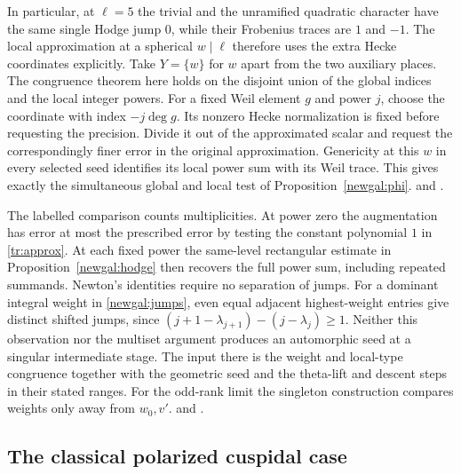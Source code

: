 In particular, at \(\ell=5\) the trivial and the unramified quadratic
character have the same single Hodge jump \(0\), while their Frobenius
traces are \(1\) and \(-1\). The local approximation at a spherical
\(w\mid\ell\) therefore uses the extra Hecke coordinates explicitly.
Take \(Y=\{w\}\) for \(w\) apart from the two auxiliary places. The
congruence theorem here holds on the disjoint union of the global
indices and the local integer powers. For a fixed Weil element \(g\)
and power \(j\), choose the coordinate with index \(-j\deg g\).
Its nonzero Hecke normalization is fixed before requesting the
precision. Divide it out of the approximated scalar and request the
correspondingly finer error in the original approximation. Genericity
at this \(w\) in every selected seed identifies its local power sum
with its Weil trace. This gives exactly the simultaneous global and local
test of Proposition~\ref{newgal:phi}.
and .

The labelled comparison counts multiplicities. At power zero the
augmentation has error at most the prescribed error by testing the
constant polynomial \(1\) in \eqref{tr:approx}. At each fixed power
the same-level rectangular estimate in Proposition~\ref{newgal:hodge}
then recovers the full power sum, including repeated summands. Newton's
identities require no separation of jumps. For a dominant integral
weight in \eqref{newgal:jumps}, even equal adjacent highest-weight
entries give distinct shifted jumps, since
\((j+1-\lambda_{j+1})-(j-\lambda_j)\ge1\). Neither this observation nor
the multiset argument produces an automorphic seed at a singular
intermediate stage. The input there is the weight and local-type
congruence together with the geometric seed and the theta-lift and
descent steps in their stated ranges. For the odd-rank limit the
singleton construction compares weights only away from \(w_0,v'\).
and .

\subsection{The classical polarized cuspidal case}

